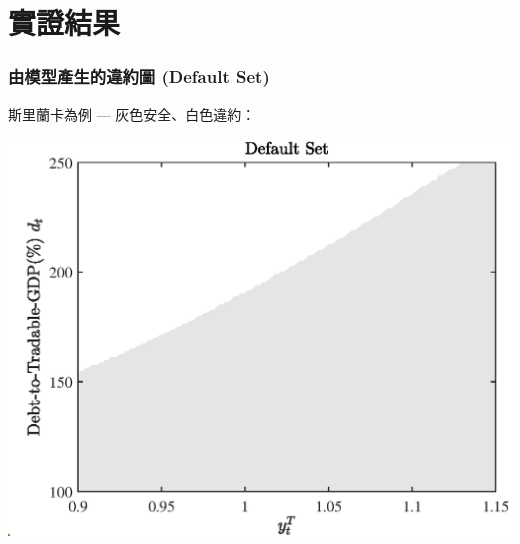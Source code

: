 \documentclass[mathserif]{beamer}
\begin{document}
    \section{實證結果}
    \begin{frame}
        \frametitle{由模型產生的違約圖 (Default Set)}
        斯里蘭卡為例 --- 灰色安全、白色違約：
        \begin{center}
        \includegraphics[height = 0.8\textheight]{fig/default_set_sri_trad_hp.eps}
        \end{center}
    \end{frame}
\end{document}
